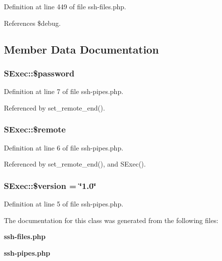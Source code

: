 Definition at line 449 of file ssh-files.php.

References \$debug.

\subsection{Member Data Documentation}
\subsubsection{\setlength{\rightskip}{0pt plus 5cm}SExec::\$password}\label{classSExec_o2}




Definition at line 7 of file ssh-pipes.php.

Referenced by set\_\-remote\_\-end().
\subsubsection{\setlength{\rightskip}{0pt plus 5cm}SExec::\$remote}\label{classSExec_o1}




Definition at line 6 of file ssh-pipes.php.

Referenced by set\_\-remote\_\-end(), and SExec().
\subsubsection{\setlength{\rightskip}{0pt plus 5cm}SExec::\$version = \char`\"{}1.0\char`\"{}}\label{classSExec_o0}




Definition at line 5 of file ssh-pipes.php.

The documentation for this class was generated from the following files:\begin{CompactItemize}
\item 
{\bf ssh-files.php}\item 
{\bf ssh-pipes.php}\end{CompactItemize}
